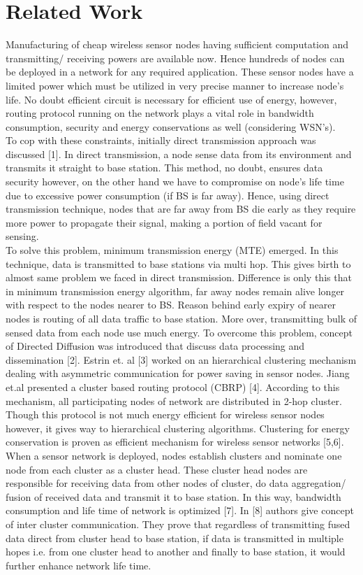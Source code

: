 \documentclass[10pt, conference, compsocconf]{IEEEtran}
\begin{document}
\section{Related Work}
Manufacturing of cheap wireless sensor nodes having sufficient computation and transmitting/ receiving powers are available now. Hence hundreds of nodes can be deployed in a network for any required application. These sensor nodes have a limited power which must be utilized in very precise manner to increase node's life. No doubt efficient circuit is necessary for efficient use of energy, however, routing protocol running on the network plays a vital role in bandwidth consumption, security and energy conservations as well (considering WSN's).\\
To cop with these constraints, initially direct transmission approach was discussed [1]. In direct transmission, a node sense data from its environment and transmits it straight to base station. This method, no doubt, ensures data security however, on the other hand we have to compromise on node's life time due to excessive power consumption (if BS is far away). Hence, using direct transmission technique, nodes that are far away from BS die early as they require more power to propagate their signal, making a portion of field vacant for sensing.\\
To solve this problem, minimum transmission energy (MTE) emerged. In this technique, data is transmitted to base stations via multi hop. This gives birth to almost same problem we faced in direct transmission. Difference is only this that in minimum transmission energy algorithm, far away nodes remain alive longer with respect to the nodes nearer to BS. Reason behind early expiry of nearer nodes is routing of all data traffic to base station. More over, transmitting bulk of sensed data from each node use much energy. To overcome this problem, concept of Directed Diffusion was introduced that discuss data processing and dissemination [2]. Estrin et. al [3] worked on an hierarchical clustering mechanism dealing with asymmetric communication for power saving in sensor nodes. Jiang et.al presented a cluster based routing protocol (CBRP) [4]. According to this mechanism, all participating nodes of network are distributed in 2-hop cluster. Though this protocol is not much energy efficient for wireless sensor nodes however, it gives way to hierarchical clustering algorithms. Clustering for energy conservation is proven as efficient mechanism for wireless sensor networks [5,6]. When a sensor network is deployed, nodes establish clusters and nominate one node from each cluster as a cluster head. These cluster head nodes are responsible for receiving data from other nodes of cluster, do data aggregation/ fusion of received data and transmit it to base station. In this way, bandwidth consumption and life time of network is optimized [7]. In [8] authors give concept of inter cluster communication. They prove that regardless of transmitting fused data direct from cluster head to base station, if data is transmitted in multiple hopes i.e. from one cluster head to another and finally to base station, it would further enhance network life time.\\
\end{document}
